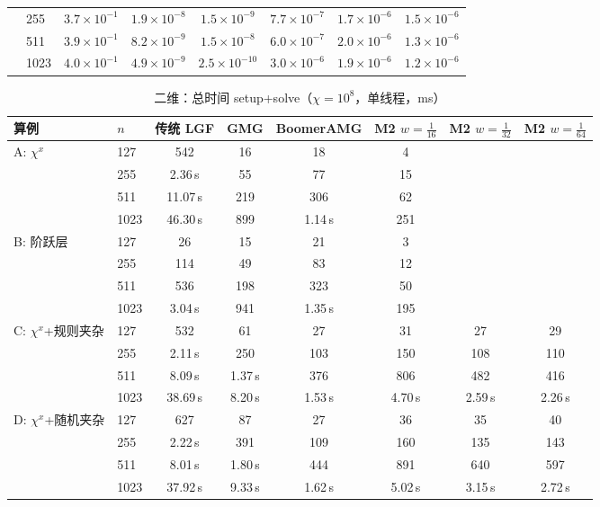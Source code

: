 \begin{table}[H]
\begin{adjustbox}{max width=\textwidth}
\begin{tabular}{llcccccc}
 & 255 & $3.7{\times}10^{-1}$ & $1.9{\times}10^{-8}$ & $1.5{\times}10^{-9}$ & $7.7{\times}10^{-7}$ & $1.7{\times}10^{-6}$ & $1.5{\times}10^{-6}$ \\
 & 511 & $3.9{\times}10^{-1}$ & $8.2{\times}10^{-9}$ & $1.5{\times}10^{-8}$ & $6.0{\times}10^{-7}$ & $2.0{\times}10^{-6}$ & $1.3{\times}10^{-6}$ \\
 & 1023 & $4.0{\times}10^{-1}$ & $4.9{\times}10^{-9}$ & $2.5{\times}10^{-10}$ & $3.0{\times}10^{-6}$ & $1.9{\times}10^{-6}$ & $1.2{\times}10^{-6}$ \\
\bottomrule
\end{tabular}
\end{adjustbox}
\end{table}

\begin{table}[H]\centering\small
\caption{二维：总时间 setup+solve（$\chi=10^8$，单线程，ms）}\label{tab:time2d}
\begin{adjustbox}{max width=\textwidth}
\begin{tabular}{llcccccc}
\toprule
算例 & $n$ & 传统 LGF & GMG & BoomerAMG & M2 $w{=}\frac1{16}$ & M2 $w{=}\frac1{32}$ & M2 $w{=}\frac1{64}$ \\
\midrule
A: $\chi^x$ & 127 & 542 & 16 & 18 & 4 &  &  \\
 & 255 & 2.36\,s & 55 & 77 & 15 &  &  \\
 & 511 & 11.07\,s & 219 & 306 & 62 &  &  \\
 & 1023 & 46.30\,s & 899 & 1.14\,s & 251 &  &  \\
\midrule
B: 阶跃层 & 127 & 26 & 15 & 21 & 3 &  &  \\
 & 255 & 114 & 49 & 83 & 12 &  &  \\
 & 511 & 536 & 198 & 323 & 50 &  &  \\
 & 1023 & 3.04\,s & 941 & 1.35\,s & 195 &  &  \\
\midrule
C: $\chi^x$+规则夹杂 & 127 & 532 & 61 & 27 & 31 & 27 & 29 \\
 & 255 & 2.11\,s & 250 & 103 & 150 & 108 & 110 \\
 & 511 & 8.09\,s & 1.37\,s & 376 & 806 & 482 & 416 \\
 & 1023 & 38.69\,s & 8.20\,s & 1.53\,s & 4.70\,s & 2.59\,s & 2.26\,s \\
\midrule
D: $\chi^x$+随机夹杂 & 127 & 627 & 87 & 27 & 36 & 35 & 40 \\
 & 255 & 2.22\,s & 391 & 109 & 160 & 135 & 143 \\
 & 511 & 8.01\,s & 1.80\,s & 444 & 891 & 640 & 597 \\
 & 1023 & 37.92\,s & 9.33\,s & 1.62\,s & 5.02\,s & 3.15\,s & 2.72\,s \\
\bottomrule
\end{tabular}
\end{adjustbox}
\end{table}

